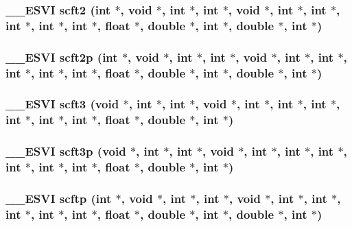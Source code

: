 \subsubsection{\setlength{\rightskip}{0pt plus 5cm}\_\-\_\-ESVI scft2 (int $\ast$, void $\ast$, int $\ast$, int $\ast$, void $\ast$, int $\ast$, int $\ast$, int $\ast$, int $\ast$, int $\ast$, float $\ast$, double $\ast$, int $\ast$, double $\ast$, int $\ast$)}\label{essl_8h_a644f5521e9d82ac536ab007bc54baee}


\subsubsection{\setlength{\rightskip}{0pt plus 5cm}\_\-\_\-ESVI scft2p (int $\ast$, void $\ast$, int $\ast$, int $\ast$, void $\ast$, int $\ast$, int $\ast$, int $\ast$, int $\ast$, int $\ast$, float $\ast$, double $\ast$, int $\ast$, double $\ast$, int $\ast$)}\label{essl_8h_bb828ba5ba14c9b71b77cc69e325f1c5}


\subsubsection{\setlength{\rightskip}{0pt plus 5cm}\_\-\_\-ESVI scft3 (void $\ast$, int $\ast$, int $\ast$, void $\ast$, int $\ast$, int $\ast$, int $\ast$, int $\ast$, int $\ast$, int $\ast$, float $\ast$, double $\ast$, int $\ast$)}\label{essl_8h_3551f2c4ea1155628ef39dbf85dd915d}


\subsubsection{\setlength{\rightskip}{0pt plus 5cm}\_\-\_\-ESVI scft3p (void $\ast$, int $\ast$, int $\ast$, void $\ast$, int $\ast$, int $\ast$, int $\ast$, int $\ast$, int $\ast$, int $\ast$, float $\ast$, double $\ast$, int $\ast$)}\label{essl_8h_64743f15799ef20f221aa0069d6fb1f4}


\subsubsection{\setlength{\rightskip}{0pt plus 5cm}\_\-\_\-ESVI scftp (int $\ast$, void $\ast$, int $\ast$, int $\ast$, void $\ast$, int $\ast$, int $\ast$, int $\ast$, int $\ast$, int $\ast$, float $\ast$, double $\ast$, int $\ast$, double $\ast$, int $\ast$)}\label{essl_8h_8c446ce15f8041cbc668bf65b4f2b18c}


